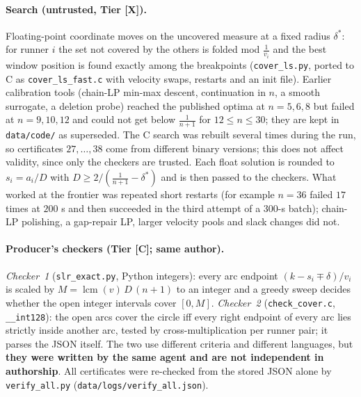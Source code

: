 \documentclass[10pt]{article}
\newcommand{\tier}[1]{\textsf{[#1]}}
\newcommand{\tC}{\tier{C}}
\newcommand{\tX}{\tier{X}}
\begin{document}
\paragraph{Search (untrusted, Tier \tX{}).} Floating-point coordinate moves on the uncovered measure at a fixed radius $\delta^\ast$: for runner $i$ the set not covered by the others is folded mod $\frac1{v_i}$ and the best window position is found exactly among the breakpoints (\texttt{cover\_ls.py}, ported to C as \texttt{cover\_ls\_fast.c} with velocity swaps, restarts and an init file). Earlier calibration tools (chain-LP min-max descent, continuation in $n$, a smooth surrogate, a deletion probe) reached the published optima at $n=5,6,8$ but failed at $n=9,10,12$ and could not get below $\frac1{n+1}$ for $12\le n\le30$; they are kept in \texttt{data/code/} as superseded. The C search was rebuilt several times during the run, so certificates $27,\dots,38$ come from different binary versions; this does not affect validity, since only the checkers are trusted. Each float solution is rounded to $s_i=a_i/D$ with $D\ge2/(\frac1{n+1}-\delta^\ast)$ and is then passed to the checkers. What worked at the frontier was repeated short restarts (for example $n=36$ failed $17$ times at $200$ s and then succeeded in the third attempt of a $300$-s batch); chain-LP polishing, a gap-repair LP, larger velocity pools and slack changes did not.
\paragraph{Producer's checkers (Tier \tC{}; same author).} \emph{Checker~1} (\texttt{slr\_exact.py}, Python integers): every arc endpoint $(k-s_i\mp\delta)/v_i$ is scaled by $M=\operatorname{lcm}(v)\,D\,(n+1)$ to an integer and a greedy sweep decides whether the open integer intervals cover $[0,M]$. \emph{Checker~2} (\texttt{check\_cover.c}, \texttt{\_\_int128}): the open arcs cover the circle iff every right endpoint of every arc lies strictly inside another arc, tested by cross-multiplication per runner pair; it parses the JSON itself. The two use different criteria and different languages, but \textbf{they were written by the same agent and are not independent in authorship}. All certificates were re-checked from the stored JSON alone by \texttt{verify\_all.py} (\texttt{data/logs/verify\_all.json}).
\end{document}

